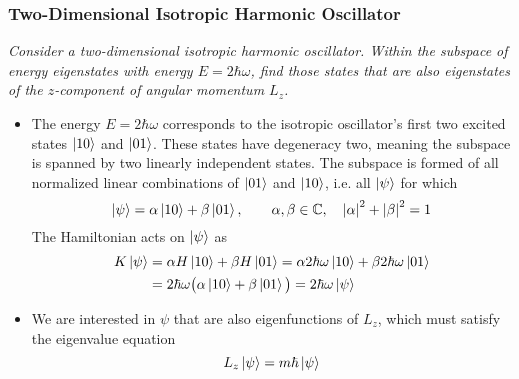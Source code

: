 \documentclass[11pt, a4paper]{article}
\begin{document}
\subsubsection{Two-Dimensional Isotropic Harmonic Oscillator}
\textit{Consider a two-dimensional isotropic harmonic oscillator. Within the subspace of energy eigenstates with energy $ E = 2\hbar \omega $, find those states that are also eigenstates of the $ z $-component of angular momentum $ L_{z} $.}
\begin{itemize}
	\item The energy $ E = 2\hbar \omega $ corresponds to the isotropic oscillator's first two excited states $ \ket{10} $ and $ \ket{01} $. These states have degeneracy two, meaning the subspace is spanned by two linearly independent states. The subspace is formed of all normalized linear combinations of $ \ket{01} $ and $ \ket{10} $, i.e. all $ \ket{\psi} $ for which
	\begin{equation*}
		\ket{\psi} = \alpha \ket{10} + \beta \ket{01}, \qquad \alpha, \beta \in \mathbb{C}, \quad \abs{\alpha}^{2} + \abs{\beta}^{2} = 1
	\end{equation*}
	The Hamiltonian acts on $ \ket{\psi} $ as
	\begin{align*}
		K \ket{\psi} &= \alpha H \ket{10} + \beta H \ket{01} = \alpha 2\hbar \omega \ket{10} + \beta 2\hbar \omega \ket{01}\\
		&=2\hbar \omega \big(\alpha \ket{10} + \beta \ket{01}\big) = 2\hbar \omega \ket{\psi}
	\end{align*}
	
	\item We are interested in $ \psi $ that are also eigenfunctions of $ L_{z} $, which must satisfy the eigenvalue equation
	\begin{equation*}
		L_{z}\ket{\psi} = m \hbar \ket{\psi}
	\end{equation*}
	

\end{itemize}
\end{document}
